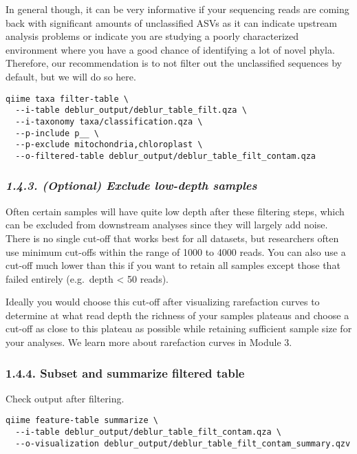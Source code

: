 \documentclass[
]{book}
\begin{document}
In general though, it can be very informative if your sequencing reads are coming back with significant amounts of unclassified ASVs as it can indicate upstream analysis problems or indicate you are studying a poorly characterized environment where you have a good chance of identifying a lot of novel phyla. Therefore, our recommendation is to not filter out the unclassified sequences by default, but we will do so here.

\begin{verbatim}
qiime taxa filter-table \
  --i-table deblur_output/deblur_table_filt.qza \
  --i-taxonomy taxa/classification.qza \
  --p-include p__ \
  --p-exclude mitochondria,chloroplast \
  --o-filtered-table deblur_output/deblur_table_filt_contam.qza
\end{verbatim}

\subsubsection{\texorpdfstring{\emph{1.4.3. (Optional) Exclude low-depth samples}}{1.4.3. (Optional) Exclude low-depth samples}}\label{optional-exclude-low-depth-samples}

Often certain samples will have quite low depth after these filtering steps, which can be excluded from downstream analyses since they will largely add noise. There is no single cut-off that works best for all datasets, but researchers often use minimum cut-offs within the range of 1000 to 4000 reads. You can also use a cut-off much lower than this if you want to retain all samples except those that failed entirely (e.g.~depth \textless{} 50 reads).

Ideally you would choose this cut-off after visualizing rarefaction curves to determine at what read depth the richness of your samples plateaus and choose a cut-off as close to this plateau as possible while retaining sufficient sample size for your analyses. We learn more about rarefaction curves in Module 3.

\subsubsection{1.4.4. Subset and summarize filtered table}\label{subset-and-summarize-filtered-table}

Check output after filtering.

\begin{verbatim}
qiime feature-table summarize \
  --i-table deblur_output/deblur_table_filt_contam.qza \
  --o-visualization deblur_output/deblur_table_filt_contam_summary.qzv
\end{verbatim}
\end{document}
